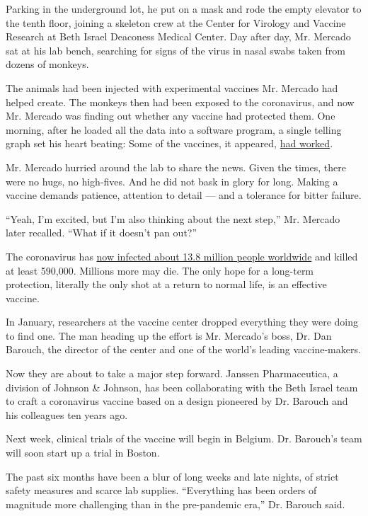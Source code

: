 Parking in the underground lot, he put on a mask and rode the empty
elevator to the tenth floor, joining a skeleton crew at the Center for
Virology and Vaccine Research at Beth Israel Deaconess Medical Center.
Day after day, Mr. Mercado sat at his lab bench, searching for signs of
the virus in nasal swabs taken from dozens of monkeys.

The animals had been injected with experimental vaccines Mr. Mercado had
helped create. The monkeys then had been exposed to the coronavirus, and
now Mr. Mercado was finding out whether any vaccine had protected them.
One morning, after he loaded all the data into a software program, a
single telling graph set his heart beating: Some of the vaccines, it
appeared,
\href{https://www.nytimes3xbfgragh.onion/2020/05/20/health/coronavirus-vaccine-harvard.html}{had
worked}.

Mr. Mercado hurried around the lab to share the news. Given the times,
there were no hugs, no high-fives. And he did not bask in glory for
long. Making a vaccine demands patience, attention to detail --- and a
tolerance for bitter failure.

``Yeah, I'm excited, but I'm also thinking about the next step,'' Mr.
Mercado later recalled. ``What if it doesn't pan out?''

The coronavirus has
\href{https://www.nytimes3xbfgragh.onion/interactive/2020/world/coronavirus-maps.html}{now
infected about 13.8 million people worldwide} and killed at least
590,000. Millions more may die. The only hope for a long-term
protection, literally the only shot at a return to normal life, is an
effective vaccine.

In January, researchers at the vaccine center dropped everything they
were doing to find one. The man heading up the effort is Mr. Mercado's
boss, Dr. Dan Barouch, the director of the center and one of the world's
leading vaccine-makers.

Now they are about to take a major step forward. Janssen Pharmaceutica,
a division of Johnson \& Johnson, has been collaborating with the Beth
Israel team to craft a coronavirus vaccine based on a design pioneered
by Dr. Barouch and his colleagues ten years ago.

Next week, clinical trials of the vaccine will begin in Belgium. Dr.
Barouch's team will soon start up a trial in Boston.

The past six months have been a blur of long weeks and late nights, of
strict safety measures and scarce lab supplies. ``Everything has been
orders of magnitude more challenging than in the pre-pandemic era,'' Dr.
Barouch said.

